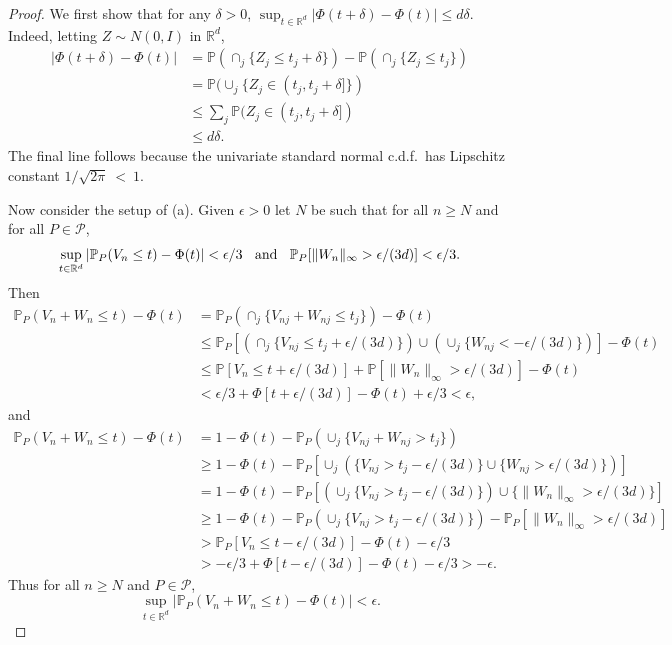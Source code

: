 \documentclass[aos]{imsart}
\renewcommand{\Pr}{\mathbb{P}}
\newcommand{\R}{\mathbb{R}}
\begin{document}
	\begin{proof}
		We first show that for any $\delta>0$, $\sup_{t\in\R^d} |\Phi(t+\delta)-\Phi(t)|\leq d\delta$. Indeed, letting $Z\sim N(0,I)$ in $\R^d$, \begin{align*}
			|\Phi(t+\delta)-\Phi(t)| &= \Pr(\cap_j \{Z_j\leq t_j + \delta\}) - \Pr(\cap_j \{Z_j\leq t_j\})\\
			&= \Pr(\cup_j\{Z_j\in(t_j,t_j+\delta]\})\\
			&\leq \sum_j \Pr(Z_j \in (t_j,t_j+\delta])\\
			&\leq d\delta.
		\end{align*}
		The final line follows because the univariate standard normal c.d.f.\ has Lipschitz constant $1/\sqrt{2\pi}~<~1$.
		
		Now consider the setup of (a). Given $\epsilon>0$ let $N$ be such that for all $n\geq N$ and for all $P\in \mathcal{P}$,
		\begin{equation*}
			\sup_{t\in\R^d} |\Pr_P(V_n\leq t)-\Phi(t)|<\epsilon/3 \text{\;\; and \;\;} \Pr_P[\|W_n\|_\infty > \epsilon/(3d)] < \epsilon/3.
		\end{equation*}
		Then \begin{align*}
			\Pr_P(V_n+W_n\leq t)-\Phi(t) &= \Pr_P(\cap_j \{V_{nj}+W_{nj} \leq t_j\}) - \Phi(t)\\
			&\leq \Pr_P[(\cap_j \{V_{nj}\leq t_j + \epsilon/(3d)\})\cup (\cup_j \{W_{nj} < -\epsilon/(3d)\})] - \Phi(t)\\
			&\leq \Pr[V_n\leq t+\epsilon/(3d)] + \Pr[\|W_n\|_\infty > \epsilon/(3d)] - \Phi(t)\\
			&< \epsilon/3 + \Phi[t+\epsilon/(3d)] - \Phi(t) + \epsilon/3 < \epsilon,
		\end{align*}
		and \begin{align*}
			\Pr_P(V_n+W_n\leq t)-\Phi(t) &= 1-\Phi(t) - \Pr_P(\cup_j\{V_{nj}+W_{nj} > t_j\})\\
			&\geq 1-\Phi(t) - \Pr_P[\cup_j(\{V_{nj} > t_j-\epsilon/(3d)\}\cup\{W_{nj} > \epsilon/(3d)\})]\\
			&= 1-\Phi(t) - \Pr_P[(\cup_j\{V_{nj} > t_j-\epsilon/(3d)\})\cup\{\|W_{n}\|_\infty > \epsilon/(3d)\}]\\
			&\geq 1-\Phi(t) - \Pr_P(\cup_j\{V_{nj} > t_j-\epsilon/(3d)\}) - \Pr_P[\|W_{n}\|_\infty > \epsilon/(3d)]\\
			&> \Pr_P[V_n\leq t-\epsilon/(3d)] - \Phi(t) - \epsilon/3\\
			&> -\epsilon/3 + \Phi[t-\epsilon/(3d)] - \Phi(t) - \epsilon/3 > -\epsilon.
		\end{align*}
		Thus for all $n\geq N$ and $P\in\mathcal{P}$,
		\begin{equation*}
			\sup_{t\in\R^d} |\Pr_P(V_n + W_n\leq t)-\Phi(t)|<\epsilon.
		\end{equation*}
		

\end{proof}
\end{document}
